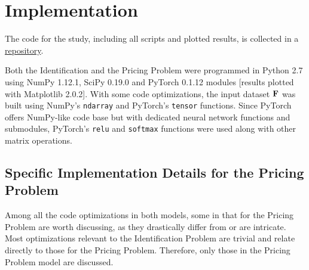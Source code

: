 \appendix
\chapter{Implementation} \label{app:Implementation}
The code for the study, including all scripts and plotted results, is collected in a \href{https://github.com/anmolkabra}{repository}.

Both the Identification and the Pricing Problem were programmed in Python 2.7 using NumPy 1.12.1, SciPy 0.19.0 and PyTorch 0.1.12 modules \cite{NPDocs,SCPOptimizeDocs,PTDocs} [results plotted with Matplotlib 2.0.2]. With some code optimizations, the input dataset $\mathbf{F}$ was built using NumPy's \texttt{ndarray} and PyTorch's \texttt{tensor} functions. Since PyTorch offers NumPy-like code base but with dedicated neural network functions and submodules, PyTorch's \texttt{relu} and \texttt{softmax} functions were used along with other matrix operations.

\section{Specific Implementation Details for the Pricing Problem} \label{app:Specific Implementation Details for the Pricing Problem}
Among all the code optimizations in both models, some in that for the Pricing Problem are worth discussing, as they drastically differ from  or are intricate. Most optimizations relevant to the Identification Problem are trivial and relate directly to those for the Pricing Problem. Therefore, only those in the Pricing Problem model are discussed.

